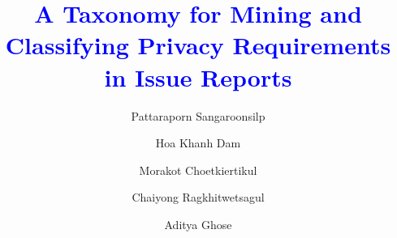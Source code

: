\documentclass[final,5p,times,twocolumn]{elsarticle}
\newcommand{\newtext}[1]{\textcolor{blue}{#1}}
\begin{document}
\title{\newtext{A Taxonomy for Mining and Classifying Privacy Requirements in Issue Reports}}


\author[1]{Pattaraporn Sangaroonsilp}

\author[1]{Hoa Khanh Dam}

\author[2]{Morakot Choetkiertikul}

\author[2]{Chaiyong Ragkhitwetsagul}

\author[1]{Aditya Ghose}

\begin{comment}
\affiliation[1]{organization={School of Computing and Information Technology, Faculty of Engineering and Information Sciences, University of Wollongong},
	addressline={Northfields Avenue},
	city={Wollongong},
	postcode={2500},
	state={NSW},
	country={Australia}}

\affiliation[2]{organization={Faculty of Information and Communication Technology, Mahidol University},
	addressline={Phutthamonthon Sai 4 Rd},
	city={Salaya},
	postcode={73170},
	state={Nakhon Pathom},
	country={Thailand}}	
\end{comment}
\end{document}
